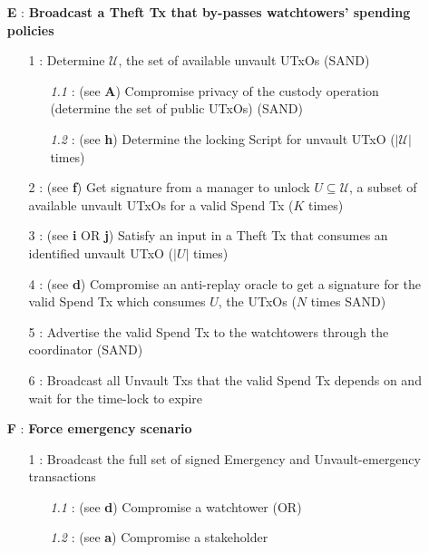 \documentclass[runningheads]{llncs}
\begin{document}
{\footnotesize
\begin{itemize}[noitemsep,parsep=0pt,partopsep=0pt, leftmargin=0.7cm]
\item[\textbf{E} :] \textbf{Broadcast a Theft Tx that by-passes watchtowers' spending policies}
\begin{itemize}[noitemsep,topsep=0pt,parsep=0pt,partopsep=0pt, leftmargin=0.8cm]
\item[1 :] Determine $\mathcal{U}$, the set of available unvault UTxOs (SAND)
\begin{itemize}[noitemsep,topsep=0pt,parsep=0pt,partopsep=0pt, leftmargin=0.9cm]
\item[\textit{1.1} :] (see \textbf{A}) Compromise privacy of the custody operation (determine the set of public UTxOs) (SAND)
\item[\textit{1.2} :] (see \textbf{h}) Determine the locking Script for unvault UTxO ($|\mathcal{U}|$ times)
\end{itemize}
\item[2 :] (see \textbf{f}) Get signature from a manager to unlock $U \subseteq \mathcal{U}$, a subset of available unvault UTxOs for a valid Spend Tx ($K$ times)
\item[3 :] (see \textbf{i} OR \textbf{j}) Satisfy  an  input  in  a  Theft  Tx  that  consumes  an  identified  unvault UTxO ($|U|$ times)
\item[4 :] (see \textbf{d}) Compromise an anti-replay oracle to get a signature for the valid Spend Tx which consumes $U$, the UTxOs ($N$ times SAND)
\item[5 :] Advertise the valid Spend Tx to the watchtowers through the coordinator (SAND)
\item[6 :] Broadcast all Unvault Txs that the valid Spend Tx depends on and wait for the time-lock to expire
\end{itemize}
\end{itemize}
}

{\footnotesize
\begin{itemize}[noitemsep,parsep=0pt,partopsep=0pt, leftmargin=0.7cm]
\item[\textbf{F} :] \textbf{Force emergency scenario}
\begin{itemize}[noitemsep,topsep=0pt,parsep=0pt,partopsep=0pt, leftmargin=0.8cm]
\item[1 :] Broadcast the full set of signed Emergency and Unvault-emergency transactions 
\begin{itemize}[noitemsep,topsep=0pt,parsep=0pt,partopsep=0pt, leftmargin=0.9cm]
\item[\textit{1.1} :] (see \textbf{d}) Compromise a watchtower (OR)
\item[\textit{1.2} :] (see \textbf{a}) Compromise a stakeholder
\end{itemize}
\end{itemize}
\end{itemize}
}
\end{document}
